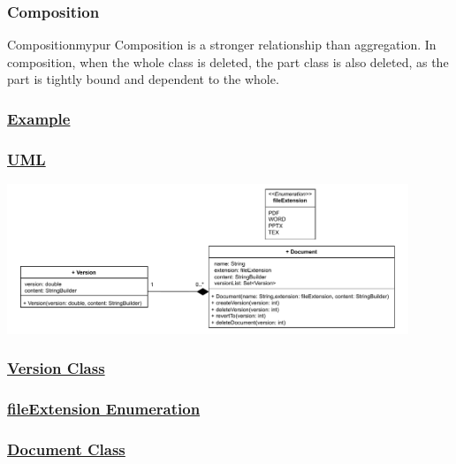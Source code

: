 \subsubsection*{Composition}

\begin{prettyBox}{Composition}{mypur}
Composition is a stronger relationship than aggregation. In composition, when the whole class is deleted, the part class is also deleted, as the part is tightly bound and dependent to the whole.
\end{prettyBox}

\subsubsection*{\underline{Example}}

\subsubsection*{\underline{UML}}

\begin{center}
\includegraphics[width=0.9\textwidth]{Chapters/Diagram/OOP/EX6/ex6.drawio.pdf}
\end{center}

\subsubsection*{\underline{Version Class}}


\subsubsection*{\underline{fileExtension Enumeration}}


\newpage
\subsubsection*{\underline{Document Class}}


